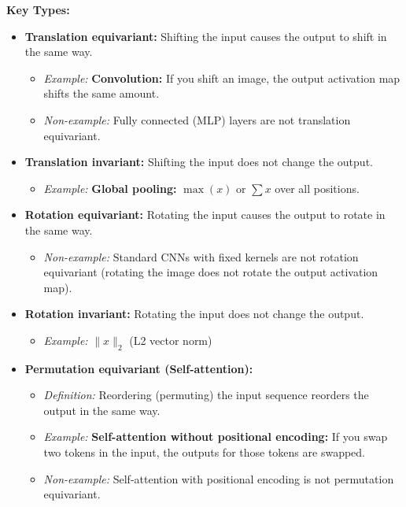\documentclass{article}
\begin{document}
\begin{multicols}{3}
\textbf{Key Types:}
\begin{itemize}
  \item \textbf{Translation equivariant:} Shifting the input causes the output to shift in the same way.
    \begin{itemize}
      \item \textit{Example:} \textbf{Convolution:} If you shift an image, the output activation map shifts the same amount.
      \item \textit{Non-example:} Fully connected (MLP) layers are not translation equivariant.
    \end{itemize}
  \item \textbf{Translation invariant:} Shifting the input does not change the output.
    \begin{itemize}
      \item \textit{Example:} \textbf{Global pooling:} $\max(x)$ or $\sum x$ over all positions.
    \end{itemize}
    \item \textbf{Rotation equivariant:} Rotating the input causes the output to rotate in the same way.
    \begin{itemize}
      \item \textit{Non-example:} Standard CNNs with fixed kernels are not rotation equivariant (rotating the image does not rotate the output activation map).
    \end{itemize}
  \item \textbf{Rotation invariant:} Rotating the input does not change the output.
    \begin{itemize}
      \item \textit{Example:} $\|x\|_2$ (L2 vector norm)
    \end{itemize}
  \item \textbf{Permutation equivariant (Self-attention):}
    \begin{itemize}
      \item \textit{Definition:} Reordering (permuting) the input sequence reorders the output in the same way.
      \item \textit{Example:} \textbf{Self-attention without positional encoding:} If you swap two tokens in the input, the outputs for those tokens are swapped.
      \item \textit{Non-example:} Self-attention with positional encoding is not permutation equivariant.
    \end{itemize}
\end{itemize}


\end{multicols}
\end{document}
